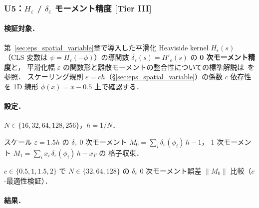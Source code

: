 %
\subsubsection{U5：\texorpdfstring{$H_\varepsilon$ / $\delta_\varepsilon$}{H-epsilon / delta-epsilon} モーメント精度 [Tier III]}
\label{sec:U5_heaviside_delta}

\paragraph{検証対象．}
第~\ref{sec:eps_spatial_variable}章で導入した平滑化 Heaviside kernel $H_\varepsilon(s)$
（CLS 変数は $\psi=H_\varepsilon(-\phi)$）の導関数
$\delta_\varepsilon(s) = H'_\varepsilon(s)$ の \textbf{0 次モーメント精度}と，
平滑化幅 $\varepsilon$ の関数形と離散モーメントの整合性についての標準解説は~\cite{OsherFedkiw2003}を参照．
スケーリング規則 $\varepsilon = c h$（§\ref{sec:eps_spatial_variable}）の係数 $c$ 依存性を
1D 線形 $\phi(x) = x - 0.5$ 上で確認する．

\paragraph{設定．}
$N \in \{16,32,64,128,256\}$，$h = 1/N$．
\begin{description}\setlength{\itemsep}{0pt}
  \item[U5-a] スケール $\varepsilon = 1.5 h$ の $\delta_\varepsilon$ 0 次モーメント
        $M_0 = \sum_i \delta_\varepsilon(\phi_i)\,h - 1$，
        1 次モーメント $M_1 = \sum_i x_i\,\delta_\varepsilon(\phi_i)\,h - x_\Gamma$ の
        格子収束．
  \item[U5-b] $c \in \{0.5, 1, 1.5, 2\}$ で $N \in \{32, 64, 128\}$ の
        $\delta_\varepsilon$ 0 次モーメント誤差 $\|M_0\|$ 比較（$c$-最適性検証）．
\end{description}

\paragraph{結果．}


